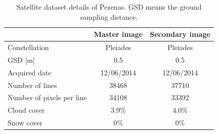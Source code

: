 
\begin{table}[htbp]
	\scriptsize %
	\centering
	\begin{tabular}{||l|c|c||}\hline
		& Master image & Secondary image\\\hline
		Constellation & Pleiades & Pleiades \\
		GSD [m] & 0.5 & 0.5\\
		Acquired date & 12/06/2014 & 12/06/2014 \\
		Number of lines & 38468 & 37710 \\
		Number of pixels per line & 34108 & 33392 \\
		Cloud cover & 3.9\% & 4.0\% \\
		Snow cover & 0\% & 0\% \\\hline
	\end{tabular}
	\caption{Satellite dataset details of Pezenas. GSD means the ground sampling distance.}
	\label{SatelliteData}
\end{table}

